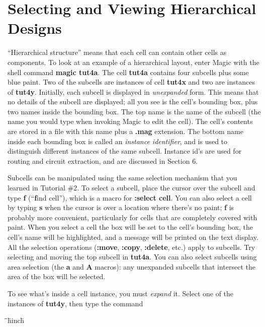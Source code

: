 \documentclass[letterpaper,twoside,12pt]{article}
\def\hinch{\hspace*{0.5in}}
\def\starti{\begin{center}\begin{tabbing}\hinch\=\hinch\=\hinch\=hinch\hinch\=\kill}
\def\endi{\end{tabbing}\end{center}}
\def\ii{\>\>\>}
\begin{document}
\section{Selecting and Viewing Hierarchical Designs}

``Hierarchical structure'' means that each cell can
contain other cells as components.
To look at an example of a hierarchical layout, enter Magic
with the shell command {\bfseries magic tut4a}.  The cell {\bfseries tut4a}
contains four subcells plus some blue paint.  Two of the subcells
are instances of cell {\bfseries tut4x} and two are instances of
{\bfseries tut4y}.  Initially, each subcell
is displayed in {\itshape unexpanded} form.  This means that
no details of the subcell are displayed;  all you see is the
cell's bounding box, plus two names inside the
bounding box.  The top name is the name of the subcell (the
name you would type when invoking Magic to edit the cell).  The
cell's contents are stored in a file with this name plus a {\bfseries .mag}
extension.  The bottom name inside each bounding box is called an
{\itshape instance identifier}, and is used to distinguish different
instances of the same subcell.  Instance id's are used for
routing and circuit extraction, and are discussed in Section 6.

Subcells can be manipulated using the same selection mechanism
that you learned in Tutorial \#2.  To select a subcell, place the
cursor over the subcell and type {\bfseries f} (``{\bfseries f}ind cell''),
which is a macro for {\bfseries :select cell}.  You can also select a cell
by typing {\bfseries s} when the cursor is over a location where there's
no paint;  {\bfseries f} is probably more convenient, particularly for
cells that are completely covered with paint.  When you select
a cell the box will be set to the cell's bounding box, the cell's
name will be highlighted, and
a message will be printed on the text display.
All the selection operations ({\bfseries :move},
{\bfseries :copy}, {\bfseries :delete}, etc.) apply to subcells.  Try selecting
and moving the top subcell in {\bfseries tut4a}.  You can also select
subcells using area selection (the {\bfseries a} and {\bfseries A} macros):
any unexpanded subcells that intersect the area of the box will
be selected.

To see what's inside a cell instance, you must {\itshape expand} it.
Select one of the instances of {\bfseries tut4y}, then type the command

\starti
   \ii {\bfseries :expand toggle}
\endi
\end{document}
